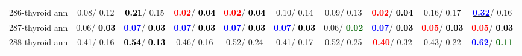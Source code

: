 \begin{table}[h]
\begin{center}
{\begin{tabular}{lc|c|c|c|c|c|c|c|c}
286-thyroid ann &   0.08/  0.12 & \textcolor{black}{\textbf{  0.21}}/  0.15 & \textcolor{red}{\textbf{  0.02}}/\textcolor{black}{\textbf{  0.04}} & \textcolor{red}{\textbf{  0.02}}/\textcolor{black}{\textbf{  0.04}} &   0.10/  0.14 &   0.09/  0.13 & \textcolor{red}{\textbf{  0.02}}/\textcolor{black}{\textbf{  0.04}} &   0.16/  0.17 & \underline{\textcolor{blue}{\textbf{  0.32}}}/  0.16 \\
287-thyroid ann &   0.06/\textcolor{black}{\textbf{  0.03}} & \textcolor{blue}{\textbf{  0.07}}/\textcolor{black}{\textbf{  0.03}} & \textcolor{blue}{\textbf{  0.07}}/\textcolor{black}{\textbf{  0.03}} & \textcolor{blue}{\textbf{  0.07}}/\textcolor{black}{\textbf{  0.03}} & \textcolor{blue}{\textbf{  0.07}}/\textcolor{black}{\textbf{  0.03}} &   0.06/\textcolor{darkgreen}{\textbf{  0.02}} & \textcolor{blue}{\textbf{  0.07}}/\textcolor{black}{\textbf{  0.03}} & \textcolor{red}{\textbf{  0.05}}/\textcolor{black}{\textbf{  0.03}} & \textcolor{red}{\textbf{  0.05}}/\textcolor{black}{\textbf{  0.03}} \\
288-thyroid ann &   0.41/  0.16 & \textcolor{black}{\textbf{  0.54}}/\textcolor{black}{\textbf{  0.13}} &   0.46/  0.16 &   0.52/  0.24 &   0.41/  0.17 &   0.52/  0.25 & \textcolor{red}{\textbf{  0.40}}/  0.32 &   0.43/  0.22 & \underline{\textcolor{blue}{\textbf{  0.62}}}/\textcolor{darkgreen}{\textbf{  0.11}} \\\end{tabular}}\label{stratsALCKappa8AllRedux50a}
\end{center}
\end{table}
